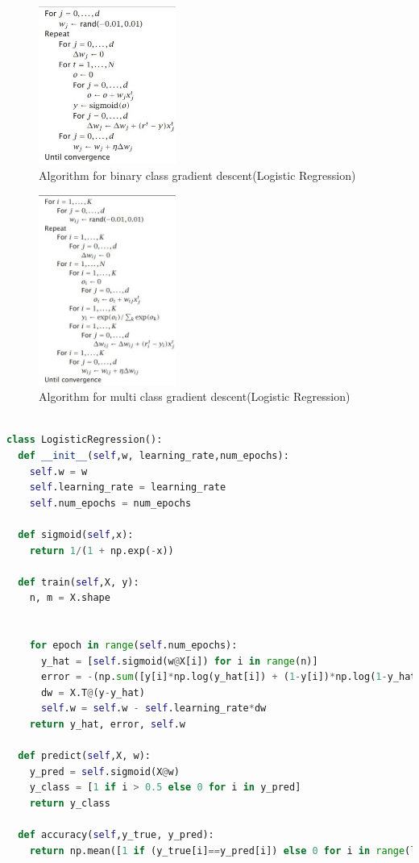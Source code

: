 \documentclass[12pt,letterpaper, onecolumn]{exam}
\begin{document}
\begin{figure}[!h]
\caption{Algorithm for binary class gradient descent(Logistic Regression)}
\centering
\includegraphics[width = 0.4\textwidth]{../images/logi_grad.jpg}
\end{figure}
\begin{figure}[!h]
\caption{Algorithm for multi class gradient descent(Logistic Regression)}
\centering
\includegraphics[width = 0.4\textwidth]{../images/logi_gradm.jpg}
\end{figure}


\newpage
\begin{lstlisting}[language=Python, caption=Logistic Regression Code]

class LogisticRegression():
  def __init__(self,w, learning_rate,num_epochs):
    self.w = w
    self.learning_rate = learning_rate
    self.num_epochs = num_epochs
   
  def sigmoid(self,x):
    return 1/(1 + np.exp(-x))

  def train(self,X, y):
    n, m = X.shape
    
    
    for epoch in range(self.num_epochs):
      y_hat = [self.sigmoid(w@X[i]) for i in range(n)]
      error = -(np.sum([y[i]*np.log(y_hat[i]) + (1-y[i])*np.log(1-y_hat[i]) for i in range(n)]))
      dw = X.T@(y-y_hat)
      self.w = self.w - self.learning_rate*dw
    return y_hat, error, self.w

  def predict(self,X, w):
    y_pred = self.sigmoid(X@w)
    y_class = [1 if i > 0.5 else 0 for i in y_pred]
    return y_class

  def accuracy(self,y_true, y_pred):
    return np.mean([1 if (y_true[i]==y_pred[i]) else 0 for i in range(len(y_pred))])


\end{lstlisting}
\end{document}
